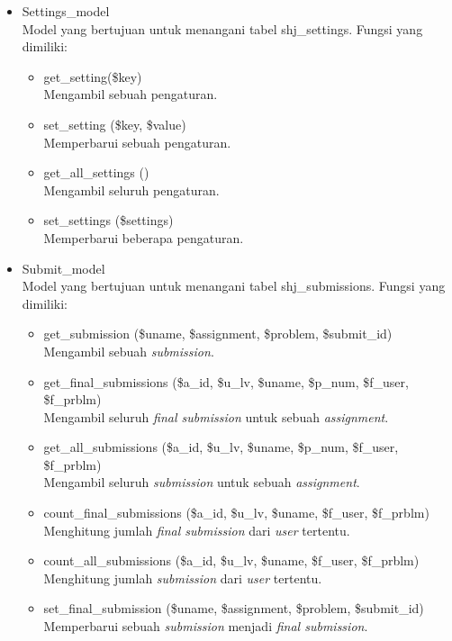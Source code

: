 \begin{itemize}
            \item Settings\_model\\
 Model yang bertujuan untuk menangani tabel shj\_settings. Fungsi yang dimiliki:
    \begin{itemize}
        \item get\_setting(\$key)\\
 Mengambil sebuah pengaturan.
        \item set\_setting (\$key, \$value) \\
        Memperbarui sebuah pengaturan.
        \item get\_all\_settings ()\\
        Mengambil seluruh pengaturan.
        \item set\_settings (\$settings)\\
 Memperbarui beberapa pengaturan.
    \end{itemize}
    \item Submit\_model\\
    Model yang bertujuan untuk menangani tabel shj\_submissions. Fungsi yang dimiliki:
        \begin{itemize}
            \item get\_submission (\$uname, \$assignment, \$problem, \$submit\_id)\\
 Mengambil sebuah \textit{submission}.
            \item get\_final\_submissions (\$a\_id, \$u\_lv, \$uname, \$p\_num, \$f\_user, \$f\_prblm)\\
 Mengambil seluruh \textit{final submission} untuk sebuah \textit{assignment}.
            \item get\_all\_submissions (\$a\_id, \$u\_lv, \$uname, \$p\_num, \$f\_user, \$f\_prblm)\\
 Mengambil seluruh \textit{submission} untuk sebuah \textit{assignment}.
    \item count\_final\_submissions (\$a\_id, \$u\_lv, \$uname, \$f\_user, \$f\_prblm)\\
 Menghitung jumlah \textit{final submission} dari \textit{user} tertentu.
    \item count\_all\_submissions (\$a\_id, \$u\_lv, \$uname, \$f\_user, \$f\_prblm)\\
 Menghitung jumlah \textit{submission} dari \textit{user} tertentu.
    \item set\_final\_submission (\$uname, \$assignment, \$problem, \$submit\_id)\\
 Memperbarui sebuah \textit{submission} menjadi \textit{final submission}.

\end{itemize}
\end{itemize}
